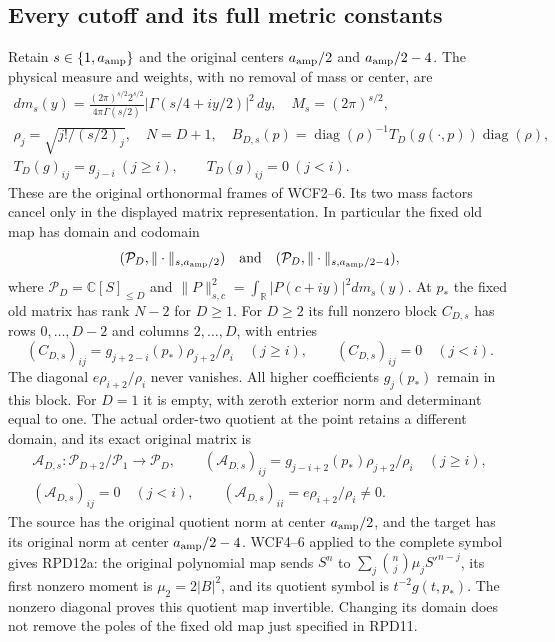 \subsection{Every cutoff and its full metric constants}

Retain $s\in\{1,a_{\rm amp}\}$ and the original centers
$a_{\rm amp}/2$ and $a_{\rm amp}/2-4$.  The physical measure and
weights, with no removal of mass or center, are
\[
 \begin{gathered}
 dm_s(y)=\frac{(2\pi)^{s/2}2^{s/2}}{4\pi\Gamma(s/2)}
       |\Gamma(s/4+iy/2)|^2\,dy,\quad M_s=(2\pi)^{s/2},\\
 \rho_j=\sqrt{j!/(s/2)_j},\quad N=D+1,\quad
 B_{D,s}(p)=\operatorname{diag}(\rho)^{-1}T_D(g(\cdot,p))
                                  \operatorname{diag}(\rho),\\
 T_D(g)_{ij}=g_{j-i}\ (j\ge i),\qquad T_D(g)_{ij}=0\ (j<i).
 \end{gathered}
 \tag{RPD11}
\]
These are the original orthonormal frames of WCF2--6.  Its two mass
factors cancel only in the displayed matrix representation.
In particular the fixed old map has domain and codomain
\[
(\mathcal P_D,\|\cdot\|_{s,a_{\rm amp}/2})\quad\text{and}\quad
(\mathcal P_D,\|\cdot\|_{s,a_{\rm amp}/2-4}),
\]
where
$\mathcal P_D=\mathbb C[S]_{\le D}$ and
$\|P\|_{s,c}^2=\int_{\mathbb R}|P(c+iy)|^2dm_s(y)$.
At $p_*$ the fixed old matrix has rank $N-2$ for $D\ge1$.
For $D\ge2$ its full nonzero block $C_{D,s}$ has rows $0,\ldots,D-2$
and columns $2,\ldots,D$, with entries
\[
 (C_{D,s})_{ij}=g_{j+2-i}(p_*)\rho_{j+2}/\rho_i\quad(j\ge i),
 \qquad (C_{D,s})_{ij}=0\quad(j<i).\tag{RPD12}
\]
The diagonal $e\rho_{i+2}/\rho_i$ never vanishes.  All higher
coefficients $g_j(p_*)$ remain in this block.  For $D=1$ it is empty,
with zeroth exterior norm and determinant equal to one.
The actual order-two quotient at the point retains a different
domain, and its exact original matrix is
\[
 \begin{gathered}
 \mathcal A_{D,s}:\mathcal P_{D+2}/\mathcal P_1\longrightarrow\mathcal P_D,
 \qquad (\mathcal A_{D,s})_{ij}=
       g_{j-i+2}(p_*)\rho_{j+2}/\rho_i\quad(j\ge i),\\
 (\mathcal A_{D,s})_{ij}=0\quad(j<i),\qquad
 (\mathcal A_{D,s})_{ii}=e\rho_{i+2}/\rho_i\ne0.
 \end{gathered}\tag{RPD12a}
\]
The source has the original quotient norm at center
$a_{\rm amp}/2$, and the target has its original norm at center
$a_{\rm amp}/2-4$.  WCF4--6 applied to the complete symbol gives
RPD12a: the original polynomial map sends
$S^n$ to $\sum_j\binom nj\mu_jS'^{n-j}$, its first nonzero moment
is $\mu_2=2|B|^2$, and its quotient symbol is $t^{-2}g(t,p_*)$.
The nonzero diagonal proves this quotient map invertible.  Changing
its domain does not remove the poles of the fixed old map just
specified in RPD11.

